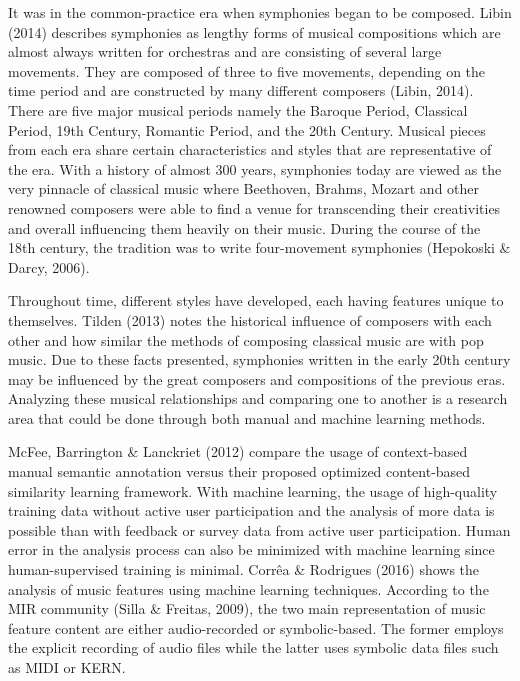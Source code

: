 	It was in the common-practice era when symphonies began to be composed. Libin (2014) describes symphonies as lengthy forms of musical compositions which are almost always written for orchestras and are consisting of several large movements. They are composed of three to five movements, depending on the time period and are constructed by many different composers (Libin, 2014). There are five major musical periods namely the Baroque Period, Classical Period, 19th Century, Romantic Period, and the 20th Century. Musical pieces from each era share certain characteristics and styles that are representative of the era. With a history of almost 300 years, symphonies today are viewed as the very pinnacle of classical music where Beethoven, Brahms, Mozart and other renowned composers were able to find a venue for transcending their creativities and overall influencing them heavily on their music. During the course of the 18th century, the tradition was  to write four-movement symphonies (Hepokoski \& Darcy, 2006). 

	Throughout time, different styles have developed, each having features unique to themselves. Tilden (2013) notes the historical influence of composers with each other and how similar the methods of composing classical music are with pop music.  Due to these facts presented, symphonies written in the early 20th century may be influenced by the great composers and compositions of the previous eras. Analyzing these musical relationships and comparing one to another is a research area that could be done through both manual and machine learning methods.

	McFee, Barrington \& Lanckriet (2012) compare the usage of context-based manual semantic annotation versus their proposed optimized content-based similarity learning framework. With machine learning, the usage of high-quality training data without active user participation and the analysis of more data is possible than with feedback or survey data from active user participation. Human error in the analysis process can also be minimized with machine learning since human-supervised training is minimal. Corrêa \& Rodrigues (2016) shows the analysis of music features using machine learning techniques. According to the MIR community (Silla \& Freitas, 2009), the two main representation of music feature content are either audio-recorded or symbolic-based. The former employs the explicit recording of audio files while the latter uses symbolic data files such as MIDI or KERN.

